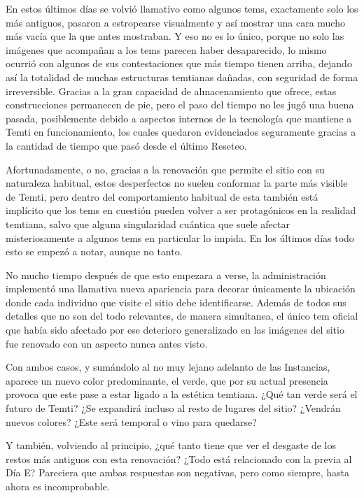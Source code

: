 \documentclass[
]{book}
\begin{document}
En estos últimos días se volvió llamativo como algunos tems, exactamente solo los más antiguos, pasaron a estropearse visualmente y así mostrar una cara mucho más vacía que la que antes mostraban. Y eso no es lo único, porque no solo las imágenes que acompañan a los tems parecen haber desaparecido, lo mismo ocurrió con algunos de sus contestaciones que más tiempo tienen arriba, dejando así la totalidad de muchas estructuras temtianas dañadas, con seguridad de forma irreversible. Gracias a la gran capacidad de almacenamiento que ofrece, estas construcciones permanecen de pie, pero el paso del tiempo no les jugó una buena pasada, posiblemente debido a aspectos internos de la tecnología que mantiene a Temti en funcionamiento, los cuales quedaron evidenciados seguramente gracias a la cantidad de tiempo que pasó desde el último Reseteo.

Afortunadamente, o no, gracias a la renovación que permite el sitio con su naturaleza habitual, estos desperfectos no suelen conformar la parte más visible de Temti, pero dentro del comportamiento habitual de esta también está implícito que los tems en cuestión pueden volver a ser protagónicos en la realidad temtiana, salvo que alguna singularidad cuántica que suele afectar misteriosamente a algunos tems en particular lo impida. En los últimos días todo esto se empezó a notar, aunque no tanto.

No mucho tiempo después de que esto empezara a verse, la administración implementó una llamativa nueva apariencia para decorar únicamente la ubicación donde cada individuo que visite el sitio debe identificarse. Además de todos sus detalles que no son del todo relevantes, de manera simultanea, el único tem oficial que había sido afectado por ese deterioro generalizado en las imágenes del sitio fue renovado con un aspecto nunca antes visto.

Con ambos casos, y sumándolo al no muy lejano adelanto de las Instancias, aparece un nuevo color predominante, el verde, que por su actual presencia provoca que este pase a estar ligado a la estética temtiana. ¿Qué tan verde será el futuro de Temti? ¿Se expandirá incluso al resto de lugares del sitio? ¿Vendrán nuevos colores? ¿Este será temporal o vino para quedarse?

Y también, volviendo al principio, ¿qué tanto tiene que ver el desgaste de los restos más antiguos con esta renovación? ¿Todo está relacionado con la previa al Día E? Pareciera que ambas respuestas son negativas, pero como siempre, hasta ahora es incomprobable.
\end{document}

